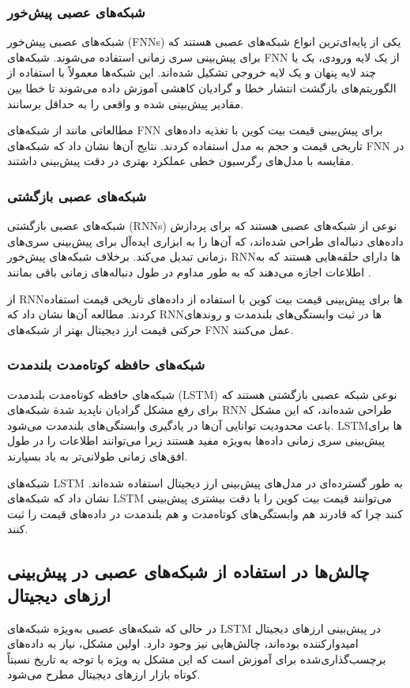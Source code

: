 \subsubsection{شبکه‌های عصبی پیش‌خور}
شبکه‌های عصبی پیش‌خور (FNNs) یکی از پایه‌ای‌ترین انواع شبکه‌های عصبی هستند که برای پیش‌بینی سری زمانی استفاده می‌شوند. شبکه‌های FNN از یک لایه ورودی، یک یا چند لایه پنهان و یک لایه خروجی تشکیل شده‌اند. این شبکه‌ها معمولاً با استفاده از الگوریتم‌های بازگشت انتشار خطا و گرادیان کاهشی آموزش داده می‌شوند تا خطا بین مقادیر پیش‌بینی شده و واقعی را به حداقل برسانند.


مطالعاتی مانند \cite{author3} از شبکه‌های FNN برای پیش‌بینی قیمت بیت کوین با تغذیه داده‌های تاریخی قیمت و حجم به مدل استفاده کردند. نتایج آن‌ها نشان داد که شبکه‌های FNN در مقایسه با مدل‌های رگرسیون خطی عملکرد بهتری در دقت پیش‌بینی داشتند.


\subsubsection{شبکه‌های عصبی بازگشتی}
شبکه‌های عصبی بازگشتی (RNNs) نوعی از شبکه‌های عصبی هستند که برای پردازش داده‌های دنباله‌ای طراحی شده‌اند، که آن‌ها را به ابزاری ایده‌آل برای پیش‌بینی سری‌های زمانی تبدیل می‌کند. برخلاف شبکه‌های پیش‌خور، RNNها دارای حلقه‌هایی هستند که به اطلاعات اجازه می‌دهند که به طور مداوم در طول دنباله‌های زمانی باقی بمانند
.

\cite{author4} از RNNها برای پیش‌بینی قیمت بیت کوین با استفاده از داده‌های تاریخی قیمت استفاده کردند. مطالعه آن‌ها نشان داد که RNNها در ثبت وابستگی‌های بلندمدت و روندهای حرکتی قیمت ارز دیجیتال بهتر از شبکه‌های FNN عمل می‌کنند.

\subsubsection{شبکه‌های حافظه کوتاه‌مدت بلندمدت}
شبکه‌های حافظه کوتاه‌مدت بلندمدت (LSTM) نوعی شبکه عصبی بازگشتی هستند که برای رفع مشکل گرادیان ناپدید شدة شبکه‌های RNN طراحی شده‌اند، که این مشکل باعث محدودیت توانایی آن‌ها در یادگیری وابستگی‌های بلندمدت می‌شود. LSTMها برای پیش‌بینی سری زمانی داده‌ها به‌ویژه مفید هستند زیرا می‌توانند اطلاعات را در طول افق‌های زمانی طولانی‌تر به یاد بسپارند.


شبکه‌های LSTM به طور گسترده‌ای در مدل‌های پیش‌بینی ارز دیجیتال استفاده شده‌اند. \cite{author5} نشان داد که شبکه‌های LSTM می‌توانند قیمت بیت کوین را با دقت بیشتری پیش‌بینی کنند چرا که قادرند هم وابستگی‌های کوتاه‌مدت و هم بلندمدت در داده‌های قیمت را ثبت کنند.


\subsection{چالش‌ها در استفاده از شبکه‌های عصبی در پیش‌بینی ارزهای دیجیتال}
در حالی که شبکه‌های عصبی به‌ویژه شبکه‌های LSTM در پیش‌بینی ارزهای دیجیتال امیدوارکننده بوده‌اند، چالش‌هایی نیز وجود دارد. اولین مشکل، نیاز به داده‌های برچسب‌گذاری‌شده برای آموزش است که این مشکل به ویژه با توجه به تاریخ نسبتاً کوتاه بازار ارزهای دیجیتال مطرح می‌شود.


